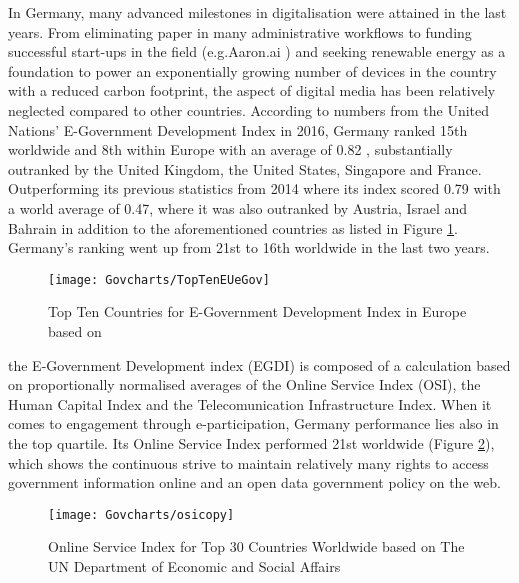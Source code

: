 In Germany, many advanced milestones in digitalisation were attained in the last years. From eliminating paper in many administrative workflows 
to funding successful start-ups in the field (e.g.Aaron.ai \cite{exist:aaron})
and seeking renewable energy as a foundation %
to power an exponentially growing number of devices in the country with a reduced carbon footprint, the aspect of digital media has been relatively neglected compared to other countries.
According to numbers from the United Nations' E-Government Development Index in 2016, Germany ranked 15th worldwide and 8th within Europe with an average of 0.82 %
, substantially outranked by the United Kingdom, the United States, Singapore and France. Outperforming its previous statistics from 2014 where its index scored  0.79 with a world average of 0.47, where it was also outranked by Austria, Israel and Bahrain \cite{freiheit:digitalisierung} in addition to the aforementioned countries as listed in Figure \ref{un:egci}.  Germany's ranking went up from 21st to 16th worldwide in the last two years.

\begin{figure}[h]
	\caption[E-Government Development Index in Europe]{Top Ten Countries for E-Government Development Index in Europe based on \cite{un:egovReport}}
	\label{un:egci}
	\texttt{[image: Govcharts/TopTenEUeGov]} 
\end{figure}


the E-Government Development index (EGDI) is composed of a calculation based on proportionally normalised averages of the Online Service Index (OSI), the Human Capital Index and the Telecomunication Infrastructure Index. 
When it comes to engagement through e-participation, Germany performance lies also in the top quartile. Its Online Service Index performed 21st worldwide (Figure \ref{un:osi}), which shows the continuous strive to maintain relatively many rights to access government information online and an open data government policy on the web.

\begin{figure}[h]
	\caption[United Nations Online Service Index (Top 30)]{Online Service Index for Top 30 Countries Worldwide based on The UN Department of Economic and Social Affairs \cite{un:egovReport}}
	\label{un:osi}
	\texttt{[image: Govcharts/osicopy]} 
\end{figure}

